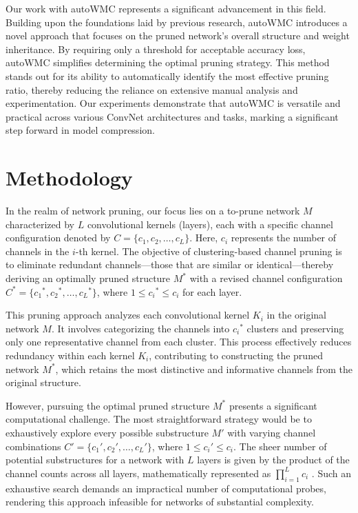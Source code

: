 \documentclass[sigconf, 10pt]{acmart}
\begin{document}
Our work with autoWMC represents a significant advancement in this field. Building upon the foundations laid by previous research, autoWMC introduces a novel approach that focuses on the pruned network's overall structure and weight inheritance. By requiring only a threshold for acceptable accuracy loss, autoWMC simplifies determining the optimal pruning strategy. This method stands out for its ability to automatically identify the most effective pruning ratio, thereby reducing the reliance on extensive manual analysis and experimentation. Our experiments demonstrate that autoWMC is versatile and practical across various ConvNet architectures and tasks, marking a significant step forward in model compression.


\section{Methodology}\label{sec3}

In the realm of network pruning, our focus lies on a to-prune network \( M \) characterized by \( L \) convolutional kernels (layers), each with a specific channel configuration denoted by \( C = \{c_1, c_2, \ldots, c_L\} \). Here, \( c_i \) represents the number of channels in the \( i \)-th kernel. The objective of clustering-based channel pruning is to eliminate redundant channels—those that are similar or identical—thereby deriving an optimally pruned structure \( M^* \) with a revised channel configuration \( C^* = \{{c_1}^*, {c_2}^*, \ldots, {c_L}^*\} \), where \( 1 \le {c_i}^* \le c_i \) for each layer.

This pruning approach analyzes each convolutional kernel \( K_i \) in the original network \( M \). It involves categorizing the channels into \( {c_i}^* \) clusters and preserving only one representative channel from each cluster. This process effectively reduces redundancy within each kernel \( K_i \), contributing to constructing the pruned network \( M^* \), which retains the most distinctive and informative channels from the original structure.

However, pursuing the optimal pruned structure \( M^* \) presents a significant computational challenge. The most straightforward strategy would be to exhaustively explore every possible substructure \( M' \) with varying channel combinations \( C' = \{c_1', c_2', \ldots, c_L'\} \), where \( 1 \le c_i' \le c_i \). The sheer number of potential substructures for a network with \( L \) layers is given by the product of the channel counts across all layers, mathematically represented as \( \prod_{i=1}^{L}c_i \) \cite{lin2021channel}. Such an exhaustive search demands an impractical number of computational probes, rendering this approach infeasible for networks of substantial complexity.
\end{document}
